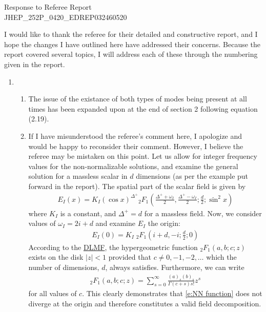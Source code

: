 \documentclass[11pt,letterpaper]{article}
\begin{document}
\vspace{.2in}
\begin{center}
    {\Large Response to Referee Report \\ JHEP\_252P\_0420\_EDREP032460520}  
\end{center}

\vspace{.25in}

I would like to thank the referee for their detailed and constructive
report, and I hope the changes I have outlined here have addressed their
concerns. Because the report covered several topics, I will address each
of these through the numbering given in the report.
\begin{enumerate}
    \item
    \begin{enumerate}
        \item The issue of the existance of both types of modes being
        present at all times has been expanded upon at the end of section 2 
        following equation (2.19).
        \item If I have misunderstood the referee's comment here, I apologize and would be 
        happy to reconsider their comment. However, I believe the referee may be mistaken on this
        point. Let us allow for integer frequency values for the non-normalizable solutions,
        and examine the general solution for a massless scalar in $d$ dimensions (as 
        per the example put forward in the report). The spatial part of the scalar field
        is given by
        \begin{align}
            \label{e:NN function}
            E_I (x) = K_I \left( \cos x \right)^{\Delta^+} {_2}F_1 \left(\frac{\Delta^+ + \omega_I}{2}, \frac{\Delta^+ - \omega_I}{2}; \frac{d}{2}; \sin^2 x \right)
        \end{align}
        where $K_I$ is a constant, and $\Delta^+ = d$ for a massless field. Now, we
        consider values of $\omega_I = 2i + d$ and examine $E_I$ the origin:
        \begin{align}
            E_I(0) = K_I \; {_2}F_1 \left( i + d, -i; \frac{d}{2}; 0 \right)
        \end{align}
        According to the \href{https://dlmf.nist.gov/15.2}{DLMF}, the hypergeometric function
        ${_2}F_1 (a, b; c; z)$ exists on the disk $| z | < 1$ provided that $c \neq 0, -1, -2, \ldots$
        which the number of dimensions, $d$, always satisfies. Furthermore, we can write
        \begin{align}
            {_2}F_1 (a, b; c; z) = \sum_{s = 0}^\infty \frac{(a)_s (b)_s}{\Gamma(c + s) s!} z^s
        \end{align}
        for all values of $c$. This clearly demonstrates that \eqref{e:NN function} does not
        diverge at the origin and therefore constitutes a valid field decomposition.
        
    \end{enumerate}
\end{enumerate}
\end{document}
